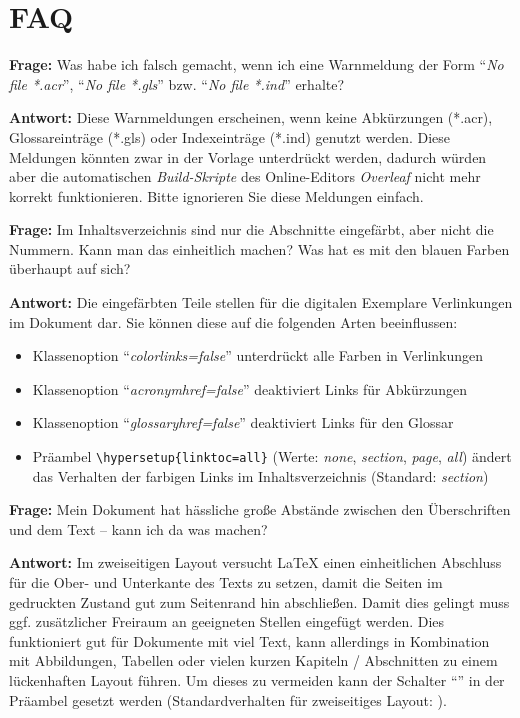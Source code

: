 \documentclass[
%
	thesis=paper,		%
	compactlistof,		%
	noauthorship,		%
%
	fancy,				%
%
%
]{hsmw-thesis}
\newcommand{\faq}[2]{\textbf{Frage: }\ignorespaces#1\par\textbf{Antwort: }\ignorespaces#2\par}
\begin{document}
	\appendix
	
	
	
	\chapter{FAQ}

	\faq{
		Was habe ich falsch gemacht, wenn ich eine Warnmeldung der Form \enquote{\textit{No file *.acr}}, \enquote{\textit{No file *.gls}} bzw. \enquote{\textit{No file *.ind}} erhalte?
	}{
		Diese Warnmeldungen erscheinen, wenn keine Abkürzungen (*.acr), Glossareinträge (*.gls) oder Indexeinträge (*.ind) genutzt werden.
		Diese Meldungen könnten zwar in der Vorlage unterdrückt werden, dadurch würden aber die automatischen \textit{Build-Skripte} des Online-Editors \textit{Overleaf} nicht mehr korrekt funktionieren.
		Bitte ignorieren Sie diese Meldungen einfach.
	}
	
	\faq{
		Im Inhaltsverzeichnis sind nur die Abschnitte eingefärbt, aber nicht die Nummern.
		Kann man das einheitlich machen?
		Was hat es mit den blauen Farben überhaupt auf sich?
	}{
		Die eingefärbten Teile stellen für die digitalen Exemplare Verlinkungen im Dokument dar.
		Sie können diese auf die folgenden Arten beeinflussen: 
		\begin{itemize}
			\item Klassenoption \enquote{\textit{colorlinks=false}} unterdrückt alle Farben in Verlinkungen
			\item Klassenoption \enquote{\textit{acronymhref=false}} deaktiviert Links für Abkürzungen
			\item Klassenoption \enquote{\textit{glossaryhref=false}} deaktiviert Links für den Glossar
			\item Präambel \texttt{\textbackslash{}hypersetup\{linktoc=all\}} (Werte: \textit{none}, \textit{section}, \textit{page}, \textit{all}) ändert das Verhalten der farbigen Links im Inhaltsverzeichnis (Standard: \textit{section})
		\end{itemize}
	}
	
	\faq{
		Mein Dokument hat hässliche große Abstände zwischen den Überschriften und dem Text -- kann ich da was machen?
	}{
		Im zweiseitigen Layout versucht LaTeX einen einheitlichen Abschluss für die Ober- und Unterkante des Texts zu setzen, damit die Seiten im gedruckten Zustand gut zum Seitenrand hin abschließen.
		Damit dies gelingt muss ggf. zusätzlicher Freiraum an geeigneten Stellen eingefügt werden.
		Dies funktioniert gut für Dokumente mit viel Text, kann allerdings in Kombination mit Abbildungen, Tabellen oder vielen kurzen Kapiteln / Abschnitten zu einem lückenhaften Layout führen.
		Um dieses zu vermeiden kann der Schalter \enquote{\textit{\string\raggedbottom}} in der Präambel gesetzt werden (Standardverhalten für zweiseitiges Layout: \textit{\string\flushbottom}).
	}
\end{document}
